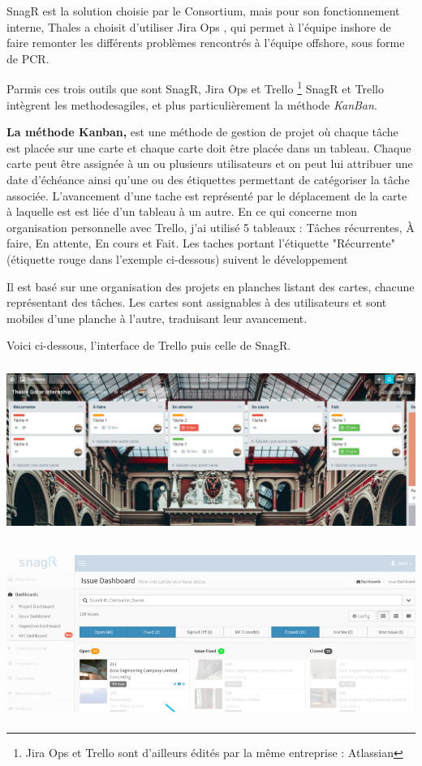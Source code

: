\gls{SnagR} est la solution choisie par le Consortium, mais pour son fonctionnement interne, Thales a choisit d'utiliser Jira Ops , qui permet à l'équipe inshore de faire remonter les différents problèmes rencontrés à l'équipe offshore, sous forme de \gls{PCR}.

Parmis ces trois outils que sont SnagR, Jira Ops et Trello \footnote{Jira Ops et Trello sont d'ailleurs édités par la même entreprise : Atlassian} SnagR et Trello intègrent les \gls{methodesagiles}, et plus particulièrement la méthode \textit{KanBan}.

\textbf{La méthode Kanban,} est une méthode de gestion de projet où chaque tâche est placée sur une carte et chaque carte doit être placée dans un tableau. Chaque carte peut être assignée à un ou plusieurs utilisateurs et on peut lui attribuer une date d'échéance ainsi qu'une ou des étiquettes permettant de catégoriser la tâche associée. L'avancement d'une tache est représenté par le déplacement de la carte à laquelle est est liée d'un tableau à un autre. 
En ce qui concerne mon organisation personnelle avec Trello, j'ai utilisé 5 tableaux :
Tâches récurrentes, À faire, En attente, En cours et Fait. Les taches portant l'étiquette "Récurrente" (étiquette rouge dans l'exemple ci-dessous) suivent le développement 


Il est basé sur une organisation des projets en planches listant des cartes, chacune représentant des tâches. Les cartes sont assignables à des utilisateurs et sont mobiles d'une planche à l'autre, traduisant leur avancement. 

Voici ci-dessous, l'interface de Trello puis celle de SnagR.

\begin{center}
\includegraphics[height=5.5cm]{ressources/images/figures/Trello.png}

\includegraphics[height=5.5cm]{ressources/images/figures/SnagR.jpeg}
\end{center}


